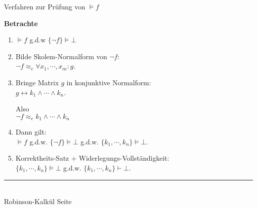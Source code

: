 \documentclass{slides}
\newcommand{\myrule}{\rule{20cm}{1mm}\\ }
\newcommand{\falsum}{\bot}
\newcounter{mypage}
\begin{document}

\begin{slide}{}
\normalsize
\begin{center}
Verfahren zur Prüfung von $\models f$ 
\end{center}
\vspace{0.5cm}

\footnotesize
\textbf{Betrachte} 
\begin{enumerate}
\item $\models f$  \quad g.d.w \quad $\{\neg f\} \models \falsum$
\item Bilde Skolem-Normalform von $\neg f$: \\[0.3cm]
      \hspace*{1.3cm} $\neg f \approx_e \forall x_1, \cdots, x_m \colon g$.
\item Bringe Matrix $g$ in konjunktive Normalform: \\[0.3cm]
      \hspace*{1.3cm} 
      $g \leftrightarrow k_1 \wedge \cdots \wedge k_n$.

      Also \\[0.3cm]
      \hspace*{1.3cm} $\neg f \approx_e k_1 \wedge \cdots \wedge k_n$
\item Dann gilt: 
      \\[0.3cm]
      \hspace*{1.3cm}
       $\models f$ \quad g.d.w. \quad $\{\neg f\} \models \falsum$ \quad g.d.w. \quad $\{k_1,\cdots,k_n\} \models \falsum$.
\item Korrektheits-Satz + Widerlegungs-Vollständigkeit:
      \\[0.3cm]
      \hspace*{1.3cm} $\{k_1,\cdots,k_n\} \models \falsum$ \quad g.d.w. \quad $\{k_1,\cdots,k_n\} \vdash \falsum$. 
\end{enumerate}

\vspace*{\fill}
\tiny \addtocounter{mypage}{1}
\myrule
Robinson-Kalkül  \hspace*{\fill} Seite 
\end{slide}

\end{document}
